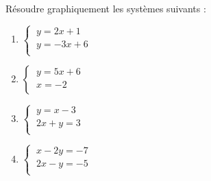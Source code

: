 \documentclass[a4paper,11pt,cours]{nsi}
\begin{document}
\begin{exercice}[ ]
	
	\begin{multicols}{3}
		Résoudre graphiquement les systèmes suivants :\\
		\vspace{1cm}
		\begin{enumerate}
			\item 	$\left\{
			\begin{array}{l}
				\ y=2x+1 \\
				\ y=-3x+6 \\
			\end{array} \right.$
			\item 	$\left\{
			\begin{array}{l}
				\ y=5x+6 \\
				\ x=-2 \\
			\end{array} \right.$
			\item 	$\left\{
			\begin{array}{l}
				\ y=x-3 \\
				\ 2x+y=3 \\
			\end{array} \right.$
			\item 	$\left\{
			\begin{array}{l}
				\ x-2y=-7 \\
				\ 2x-y=-5 \\
			\end{array} \right.$	
		\end{enumerate}
	\end{multicols}
\end{exercice}
\end{document}
